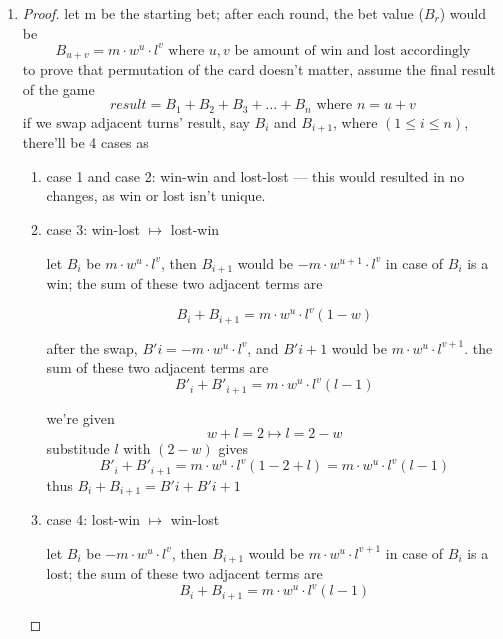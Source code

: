 \begin{enumerate}
  \item 
  \begin{proof}
  let m be the starting bet; after each round,
  the bet value ($B_r$) would be
  \[
  B_{u+v} = m \cdot w^u \cdot l^v \text{ where } u, v
  \text{ be amount of win and lost accordingly}
  \]
  to prove that permutation of the card doesn't
  matter, assume the final result of the game
  \[
  result = B_1 + B_2 + B_3 + \dots + B_n
  \text{ where } n = u + v
  \]
  if we swap adjacent turns' result, say $B_i$
  and $B_{i+1}$, where $(1 \leq i \leq n)$, there'll be 4
  cases as
  \begin{enumerate}[label={}]
  \item case 1 and case 2: win-win and lost-lost ---
  this would resulted in no changes, as win or lost
  isn't unique.
  \item case 3: win-lost $\mapsto$ lost-win

  \vspace{1em}

  let $B_i$ be $m \cdot w^u \cdot l^v$, then $B_{i+1}$
  would be $-m \cdot w^{u+1} \cdot l^v$ in case of
  $B_i$ is a win; the sum of these two adjacent terms
  are

  \[
  B_i + B_{i+1} = m \cdot w^u \cdot l^v (1 - w)
  \]

  \vspace{1em}

  after the swap, $B'i = - m \cdot w^u \cdot l^v$, and
  $B'{i+1}$ would be $m \cdot w^u \cdot l^{v+1}$. the
  sum of these two adjacent terms are
  \[
  B'_i + B'_{i+1} = m \cdot w^u \cdot l^v (l-1)
  \]

  we're given
  \[
  w + l = 2 \mapsto l = 2-w
  \]
  substitude $l$ with $(2-w)$ gives
  \[
  B'_i + B'_{i+1} = m \cdot w^u \cdot l^v (1-2+l) = m
  \cdot w^u \cdot l^v (l-1)
  \]
  thus $B_i + B_{i+1} = B'i + B'{i+1}$

  \vspace{1em}
  \item case 4: lost-win $\mapsto$ win-lost

  \vspace{1em}

  let $B_i$ be $- m \cdot w^u \cdot l^v$, then
  $B_{i+1}$ would be $m \cdot w^u \cdot l^{v+1}$
  in case of $B_i$ is a lost; the sum of these two
  adjacent terms are
  \[
  B_i + B_{i+1} = m \cdot w^u \cdot l^v (l - 1)
  \]

  \vspace{1em}


\end{enumerate}
\end{proof}
\end{enumerate}
